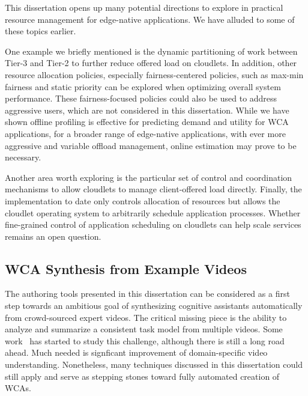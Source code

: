 This dissertation opens up many potential directions to explore in practical
resource management for edge-native applications. We have alluded to some of
these topics earlier. 

One example we briefly mentioned is the dynamic partitioning of work between
Tier-3 and Tier-2 to further reduce offered load on cloudlets.  In addition,
other resource allocation policies, especially fairness-centered policies, such
as max-min fairness and static priority can be explored when optimizing overall
system performance. These fairness-focused policies could also be used to
address aggressive users, which are not considered in this dissertation.  While
we have shown offline profiling is effective for predicting demand and utility
for WCA applications, for a broader range of edge-native applications, with ever
more aggressive and variable offload management, online estimation may prove to
be necessary. 

Another area worth exploring is the particular set of control and coordination
mechanisms to allow cloudlets to manage client-offered load directly. Finally,
the implementation to date only controls allocation of resources but allows the
cloudlet operating system to arbitrarily schedule application processes. Whether
fine-grained control of application scheduling on cloudlets can help scale
services remains an open question.


\subsection{WCA Synthesis from Example Videos}

The authoring tools presented in this dissertation can be considered as a first
step towards an ambitious goal of synthesizing cognitive assistants
automatically from crowd-sourced expert videos. The critical missing piece is
the ability to analyze and summarize a consistent task model from multiple
videos. Some work~\cite{pham2018unsupervised} has started to study this
challenge, although there is still a long road ahead. Much needed is signficant
improvement of domain-specific video understanding. Nonetheless, many techniques
discussed in this dissertation could still apply and serve as stepping stones
toward fully automated creation of WCAs. 